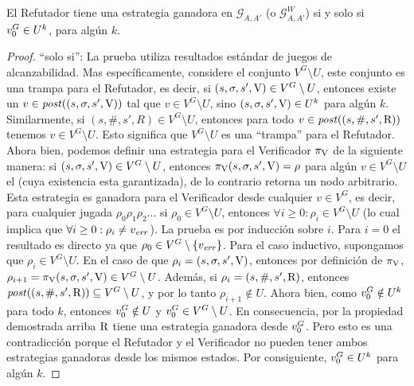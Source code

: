 \begin{lemma} \label{lemma:RefWinStrat} El Refutador tiene una estrategia ganadora en $\mathcal{G}_{A, A'}$ (o $\mathcal{G}^W_{A, A'}$) si y solo si $v_0^G \in U^k$, para algún $k$.
\end{lemma}
\begin{proof} 
	``solo si'': La prueba utiliza resultados estándar de juegos de alcanzabilidad. Mas específicamente, considere el conjunto $V^G \setminus U$, este conjunto es una trampa para el Refutador, es decir, si $(s,\sigma, s', \mathrm{V}) \in V^G \setminus U$, entonces existe un $v \in \mathit{post}((s,\sigma, s', \mathrm{V}))$ tal que 
$v \in V^G \setminus U$, sino
$(s,\sigma, s', \mathrm{V}) \in U^k$ para algún $k$. Similarmente, si $(s,\#, s', R) \in V^G \setminus U$, entonces para todo $v \in \mathit{post}((s,\#, s', \mathrm{R}))$ 
tenemos $v \in V^G \setminus U$. Esto significa que $V^G \setminus U$ es una ``trampa'' para el Refutador. 
Ahora bien, podemos definir una estrategia para el Verificador $\pi_{\mathrm{V}}$ de la siguiente manera: si $(s, \sigma, s', \mathrm{V}) \in V^G \setminus U$, entonces
$\pi_{\mathrm{V}}(s, \sigma, s', \mathrm{V}) = \rho$ para algún $v \in V^G \setminus U$ el (cuya existencia esta garantizada), de lo contrario retorna un nodo arbitrario. 
Esta estrategia es ganadora para el Verificador desde cualquier $v \in V^G$, es decir, para cualquier jugada $\rho_0 \rho_1 \rho_2 \dots$ 
si $\rho_0 \in V^G \setminus U$, entonces $\forall i \geq 0: \rho_i \in V^G \setminus U$ 
(lo cual implica que $\forall i \geq 0: \rho_i \neq v_{\mathit{err}}$). 
La prueba es por inducción sobre $i$. Para $i=0$ el resultado es directo ya que $\rho_0 \in V^G \setminus \{v_{\mathit{err}}\}$. Para el caso inductivo,
supongamos que $\rho_i \in V^G \setminus U$. En el caso de que $\rho_i = (s, \sigma, s', \mathrm{V})$, entonces por definición de $\pi_{\mathrm{V}}$, 
$\rho_{i+1} = \pi_{\mathrm{V}}(s,\sigma, s', \mathrm{V}) \in V^G \setminus U$.
Además, si $\rho_i = (s, \#, s', \mathrm{R})$, entonces $\mathit{post}((s, \#, s', \mathrm{R})) \subseteq V^G \setminus U$, 
y por lo tanto $\rho_{i+1} \notin U$. 
Ahora bien, como $v_0^G \notin U^k$ para todo $k$, entonces $v_0^G \notin U$ y $v_0^G \in V^G \setminus U$. 
En consecuencia, por la propiedad demostrada arriba $\mathrm{R}$ tiene una estrategia ganadora desde 
$v_0^G$. Pero esto es una contradicción porque el Refutador y el Verificador no pueden tener ambos estrategias ganadoras desde los mismos estados.
Por consiguiente, $v_0^G \in U^k$ para algún $k$.
	

\end{proof}
